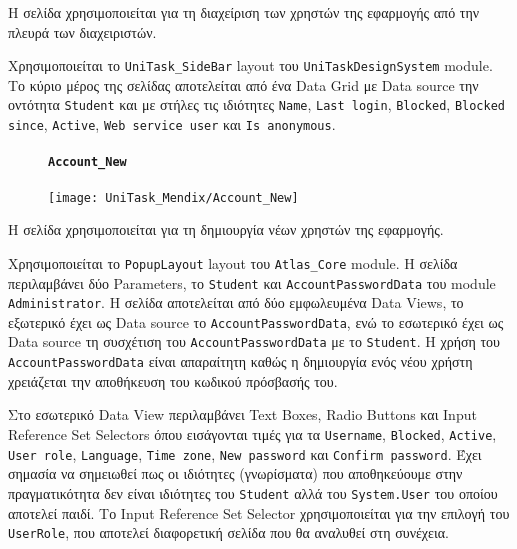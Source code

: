                     Η σελίδα χρησιμοποιείται για τη διαχείριση των χρηστών της εφαρμογής από την πλευρά των διαχειριστών.

                    Χρησιμοποιείται το \texttt{UniTask\_SideBar} layout του \texttt{UniTaskDesignSystem} module. Το κύριο μέρος της σελίδας αποτελείται από ένα Data Grid με Data source την οντότητα \texttt{Student} και με στήλες τις ιδιότητες \texttt{Name}, \texttt{Last login}, \texttt{Blocked}, \texttt{Blocked since}, \texttt{Active}, \texttt{Web service user} και \texttt{Is anonymous}.

                \begin{figure}[H] \noindent
                    \paragraph{\texttt{Account\_New}}
                    \begin{center}
                        \texttt{[image: UniTask\_Mendix/Account\_New]}
                    \end{center}
                \end{figure}

                    Η σελίδα χρησιμοποιείται για τη δημιουργία νέων χρηστών της εφαρμογής.

                    Χρησιμοποιείται το \texttt{PopupLayout} layout του \texttt{Atlas\_Core} module. Η σελίδα περιλαμβάνει δύο Parameters, το \texttt{Student} και \texttt{AccountPasswordData} του module \linebreak \texttt{Administrator}. Η σελίδα αποτελείται από δύο εμφωλευμένα Data Views, το εξωτερικό έχει ως Data source το \texttt{AccountPasswordData}, ενώ το εσωτερικό έχει ως Data source τη συσχέτιση του \texttt{AccountPasswordData} με το \texttt{Student}. Η χρήση του \texttt{AccountPasswordData} είναι απαραίτητη καθώς η δημιουργία ενός νέου χρήστη χρειάζεται την αποθήκευση του κωδικού πρόσβασής του.

                    Στο εσωτερικό Data View περιλαμβάνει Text Boxes, Radio Buttons και Input \linebreak Reference Set Selectors όπου εισάγονται τιμές για τα \texttt{Username}, \texttt{Blocked}, \texttt{Active}, \texttt{User role}, \texttt{Language}, \texttt{Time zone}, \texttt{New password} και \texttt{Confirm password}. Έχει σημασία να σημειωθεί πως οι ιδιότητες (γνωρίσματα) που αποθηκεύουμε στην πραγματικότητα δεν είναι ιδιότητες του \texttt{Student} αλλά του \texttt{System.User} του οποίου αποτελεί παιδί. Το Input Reference Set Selector χρησιμοποιείται για την επιλογή του \texttt{UserRole}, που αποτελεί διαφορετική σελίδα που θα αναλυθεί στη συνέχεια.

